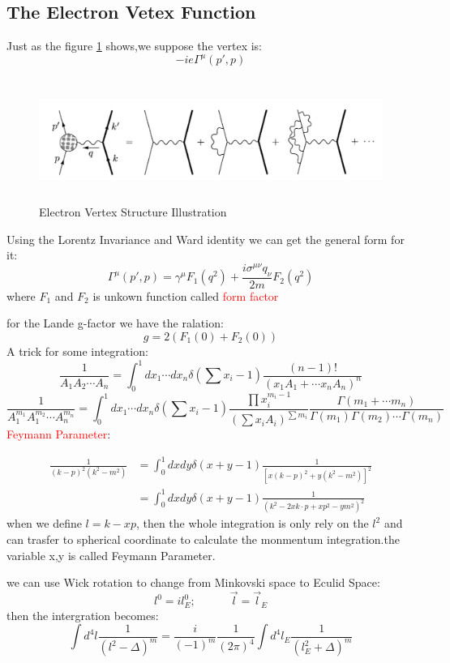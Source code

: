 \subsection{The Electron Vetex Function}
Just as the figure \ref{fig:vertex} shows,we suppose the vertex is:
\[-ie\Gamma^\mu(p',p)\] 
\begin{figure}
\begin{center}
\includegraphics[height=4cm]{figures/vertex}
\caption{Electron Vertex Structure Illustration}
\label{fig:vertex}
\end{center}
\end{figure}
Using the Lorentz Invariance and Ward identity we can get the general form for it:
\[\Gamma^\mu(p',p)=\gamma^\mu F_1(q^2)+\frac{i\sigma^{\mu\nu}q_\nu}{2m}F_2(q^2)\]
where $F_1$ and $F_2$ is unkown function called \textcolor{red}{form factor}\par
for the Lande g-factor we have the ralation:
\[g=2(F_1(0)+F_2(0))\]
A trick for some integration:
\[\frac{1}{A_1A_2\cdots A_n}=\int_0^1dx_1\cdots dx_n\delta(\sum x_i-1)\frac{(n-1)!}{(x_1A_1+\cdots x_n A_n)^n}\]
\[\frac{1}{A_1^{m_1}A_1^{m_2}\cdots A_n^{m_n}}=\int_0^1dx_1\cdots dx_n\delta(\sum x_i-1)\frac{\prod x_i^{m_i-1}}{(\sum x_i A_i)^{\sum m_i}}\frac{\Gamma(m_1+\cdots m_n)}{\Gamma(m_1)\Gamma(m_2)\cdots\Gamma(m_n)}\]
\textcolor{red}{Feymann Parameter}:\par
\begin{align*}
\frac{1}{(k-p)^2(k^2-m^2)}&=\int_0^1 dxdy\delta(x+y-1)\frac{1}{[x(k-p)^2+y(k^2-m^2)]^2}\\
&=\int_0^1 dxdy\delta(x+y-1)\frac{1}{(k^2-2xk\cdot p+xp^2-ym^2)^2}
\end{align*}
when we define $l=k-xp$, then the whole integration is only rely on the $l^2$ and can trasfer to spherical coordinate to calculate the monmentum integration.the variable x,y is called Feymann Parameter.\par
we can use Wick rotation to change from Minkovski space to Eculid Space:
\[l^0=il_E^0;\hspace{3em} \vec{l}=\vec{l}_E\] 
then the intergration becomes:
\[\int d^4l\frac{1}{(l^2-\Delta)^m}=\frac{i}{(-1)^m}\frac{1}{(2\pi)^4}\int d^4l_E\frac{1}{(l_E^2+\Delta)^m}\]
